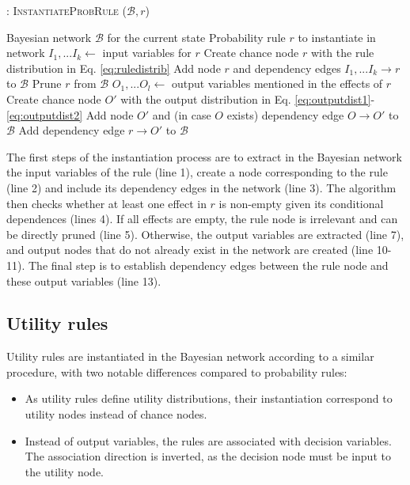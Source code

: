 \begin{algorithm}[h!]
\caption{: \textsc{InstantiateProbRule} ($\mathcal{B}, \mathit{r}$)}
\begin{algorithmic}[1] \vspace{1mm}
\REQUIRE Bayesian network $\mathcal{B}$ for the current state
\REQUIRE Probability rule $\mathit{r}$ to instantiate in network  \vspace{1mm}
\STATE $I_1,...I_k \leftarrow$ input variables for $\mathit{r}$
\STATE Create chance node $r$ with the rule distribution in Eq. \eqref{eq:ruledistrib}
\STATE Add node $r$ and dependency edges $I_1,...I_k \rightarrow r$ to $\mathcal{B}$ 
\STATE Prune $r$ from $\mathcal{B}$
\ELSE
\STATE $O_1,...O_l \leftarrow$ output variables mentioned in the effects of $r$
\STATE Create chance node $O'$ with the output distribution in Eq. \eqref{eq:outputdist1}-\eqref{eq:outputdist2}
\STATE Add node $O'$ and (in case $O$ exists) dependency edge $O \rightarrow O'$ to $\mathcal{B}$
\ENDIF
\STATE Add dependency edge $r \rightarrow O'$ to $\mathcal{B}$ 
\ENDFOR
\ENDIF
\end{algorithmic}
\label{algo:instantiateProbRule}
\end{algorithm}

The first steps of the instantiation process are to extract in the Bayesian network the input variables of the rule (line 1), create a node corresponding to the rule (line 2) and include its dependency edges in the network (line 3).  The algorithm then checks whether at least one effect in $r$ is non-empty given its conditional dependences (lines 4).  If all effects are empty, the rule node is irrelevant and can be directly pruned (line 5). Otherwise, the output variables are extracted (line 7), and output nodes that do not already exist in the network are created (line 10-11). The final step is to establish dependency edges between the rule node and these output variables (line 13).


\subsection{Utility rules}

Utility rules are instantiated in the Bayesian network according to a similar procedure, with two notable differences compared to probability rules: \begin{itemize}
\item As utility rules define utility distributions, their instantiation correspond to utility nodes instead of chance nodes.
\item Instead of output variables, the rules are associated with decision variables.  The association direction is inverted, as the decision node must be input to the utility node.
\end{itemize} 

